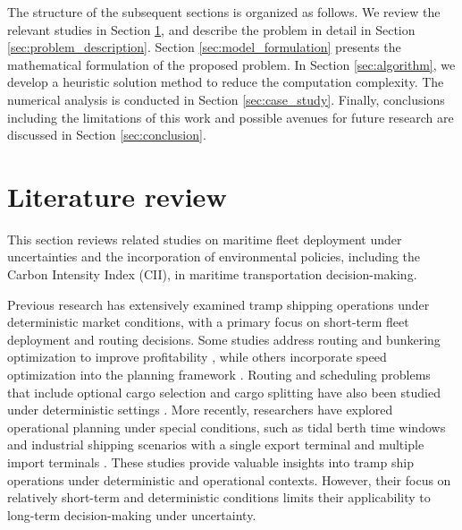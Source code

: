 \documentclass[11pt,english]{article}
\begin{document}
The structure of the subsequent sections is organized as follows. We review the relevant studies in Section \ref{sec:literature}, and describe the problem in detail in Section \ref{sec:problem_description}. Section \ref{sec:model_formulation} presents the mathematical formulation of the proposed problem. In Section \ref{sec:algorithm}, we develop a heuristic solution method to reduce the computation complexity. The numerical analysis is conducted in Section \ref{sec:case_study}. Finally, conclusions including the limitations of this work and possible avenues for future research are discussed in Section \ref{sec:conclusion}.


\section{Literature review}
\label{sec:literature}

This section reviews related studies on maritime fleet deployment under uncertainties and the incorporation of environmental policies, including the Carbon Intensity Index (CII), in maritime transportation decision-making.

Previous research has extensively examined tramp shipping operations under deterministic market conditions, with a primary focus on short-term fleet deployment and routing decisions. Some studies address routing and bunkering optimization to improve profitability \citep{meng2015tailored,he2024route}, while others incorporate speed optimization into the planning framework \citep{he2024route,tamburini2025rich}. Routing and scheduling problems that include optional cargo selection and cargo splitting have also been studied under deterministic settings \citep{korsvik2011large,cheng2025cargo}. More recently, researchers have explored operational planning under special conditions, such as tidal berth time windows \citep{gao2023tramp} and industrial shipping scenarios with a single export terminal and multiple import terminals \citep{song2025bulk}. These studies provide valuable insights into tramp ship operations under deterministic and operational contexts. However, their focus on relatively short-term and deterministic conditions limits their applicability to long-term decision-making under uncertainty.
\end{document}
